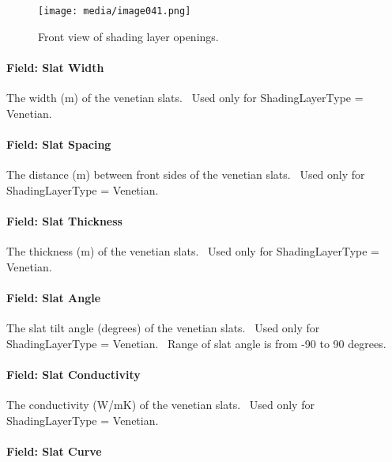 \begin{figure}[hbtp] %
\centering
\texttt{[image: media/image041.png]}
\caption{Front view of shading layer openings. \protect \label{fig:front-view-of-shading-layer-openings.}}
\end{figure}

\paragraph{Field: Slat Width}\label{field-slat-width-1}

The width (m) of the venetian slats.~ Used only for ShadingLayerType = Venetian.

\paragraph{Field: Slat Spacing}\label{field-slat-spacing}

The distance (m) between front sides of the venetian slats.~ Used only for ShadingLayerType = Venetian.

\paragraph{Field: Slat Thickness}\label{field-slat-thickness-1}

The thickness (m) of the venetian slats.~ Used only for ShadingLayerType = Venetian.

\paragraph{Field: Slat Angle}\label{field-slat-angle-1}

The slat tilt angle (degrees) of the venetian slats.~ Used only for ShadingLayerType = Venetian.~ Range of slat angle is from -90 to 90 degrees.

\paragraph{Field: Slat Conductivity}\label{field-slat-conductivity-1}

The conductivity (W/mK) of the venetian slats.~ Used only for ShadingLayerType = Venetian.

\paragraph{Field: Slat Curve}\label{field-slat-curve}

